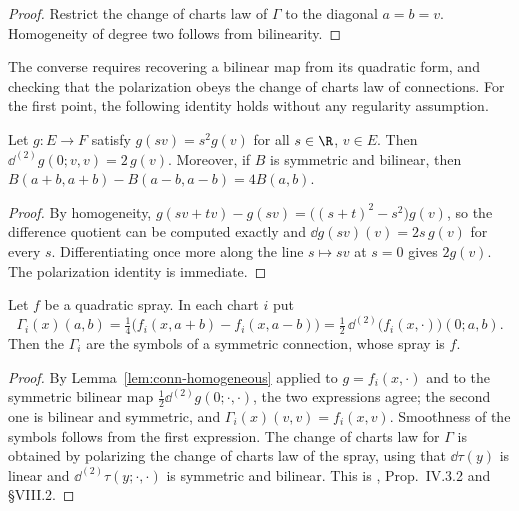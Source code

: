 \begin{proof}
  \leanok
  Restrict the change of charts law of $\Gamma$ to the diagonal $a = b = v$. Homogeneity of degree
  two follows from bilinearity.
\end{proof}

The converse requires recovering a bilinear map from its quadratic form, and checking that the
polarization obeys the change of charts law of connections. For the first point, the following
identity holds without any regularity assumption.

\begin{lemma}
  \label{lem:conn-homogeneous}
  \leanok
  Let $g \colon E \to F$ satisfy $g(s v) = s^2 g(v)$ for all $s \in \R$, $v \in E$. Then
  $\dd^{(2)} g(0; v, v) = 2\, g(v)$. Moreover, if $B$ is symmetric and bilinear, then
  $B(a + b, a + b) - B(a - b, a - b) = 4 B(a, b)$.
\end{lemma}

\begin{proof}
  \leanok
  By homogeneity, $g(s v + t v) - g(s v) = \bigl((s + t)^2 - s^2\bigr) g(v)$, so the difference
  quotient can be computed exactly and $\dd g(s v)(v) = 2 s\, g(v)$ for every $s$.
  Differentiating once more along the line $s \mapsto s v$ at $s = 0$ gives $2 g(v)$. The
  polarization identity is immediate.
\end{proof}

\begin{theorem}
  \label{thm:conn-spray-to-connection}
  \leanok
  Let $f$ be a quadratic spray. In each chart $i$ put
  \[
    \Gamma_i(x)(a, b) = \tfrac14\bigl(f_i(x, a + b) - f_i(x, a - b)\bigr)
      = \tfrac12\, \dd^{(2)}\bigl(f_i(x, \cdot)\bigr)(0; a, b).
  \]
  Then the $\Gamma_i$ are the symbols of a symmetric connection, whose spray is $f$.
\end{theorem}

\begin{proof}
  \leanok
  By Lemma~\ref{lem:conn-homogeneous} applied to $g = f_i(x, \cdot)$ and to the symmetric
  bilinear map $\tfrac12 \dd^{(2)} g(0; \cdot, \cdot)$, the two expressions agree; the second one
  is bilinear and symmetric, and $\Gamma_i(x)(v, v) = f_i(x, v)$. Smoothness of the symbols
  follows from the first expression. The change of charts law for $\Gamma$ is obtained by
  polarizing the change of charts law of the spray, using that $\dd\tau(y)$ is linear and
  $\dd^{(2)}\tau(y; \cdot, \cdot)$ is symmetric and bilinear. This is \cite{Lan99}, Prop.~IV.3.2
  and \S VIII.2.
\end{proof}

